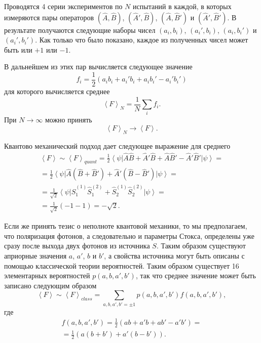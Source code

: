 Проводятся 4 серии экспериментов по $N$ испытаний в каждой, в которых
измеряются пары операторов $\left(\hat{A},\hat{B}\right)$,
$\left(\hat{A}',\hat{B}\right)$, $\left(\hat{A},\hat{B}'\right)$ и
$\left(\hat{A}',\hat{B}'\right)$. В результате получаются следующие
наборы чисел $\left(a_i, b_i\right)$, $\left(a_i', b_i\right)$, $\left(a_i, b_i'\right)$ и
$\left(a_i', b_i'\right)$. Как только что было показано, каждое
из полученных чисел может быть или $+1$ или $-1$.

В дальнейшем из этих пар вычисляется следующее значение
\begin{equation}
f_i = \frac{1}{2}\left(
a_i b_i + a_i' b_i + a_i b_i' - a_i' b_i'
\right)
\nonumber
\end{equation}
для которого вычисляется среднее
\begin{equation}
\left<F\right>_N = \frac{1}{N}\sum_i f_i.
\label{eqEntangFmain}
\end{equation}
При $N \rightarrow \infty$ можно принять
\begin{equation}
\left<F\right>_N \rightarrow \left<F\right>.
\nonumber
\end{equation}

Квантово механический подход дает следующее выражение для среднего 
\begin{eqnarray}
 \left<F\right> \sim \left<F\right>_{quant} 
=\frac{1}{2}
\left<\psi\right|
\hat{A}\hat{B} + \hat{A}'\hat{B} + \hat{A}\hat{B}' - \hat{A}'\hat{B}'
\left|\psi\right> = 
\nonumber \\
=\frac{1}{2}
\left<\psi\right|
\hat{A}\left(\hat{B} + \hat{B}'\right) + \hat{A}' \left(\hat{B}  -
\hat{B}' \right)
\left|\psi\right> = 
\nonumber \\
= \frac{1}{\sqrt{2}}
\left<\psi\right|
\hat{S}_1^{(1)}\hat{S}_1^{(2)} + \hat{S}_2^{(1)}\hat{S}_2^{(2)}
\left|\psi\right> =
\nonumber \\
= \frac{1}{\sqrt{2}}
\left(-1 - 1\right) = - \sqrt{2}.
\label{eqEntangQuant}
\end{eqnarray}

Если же принять тезис о неполноте квантовой механики, то мы
предполагаем, что поляризация фотонов, а следовательно и параметры
Стокса, определены уже сразу после выхода двух фотонов из источника
$S$.  
Таким образом существуют априорные значения $a$, $a'$, $b$ и $b'$,
а свойства источника могут быть описаны с помощью
классической теории вероятностей.
Таким образом существует 16 элементарных
вероятностей $p\left(a,b,a',b'\right)$, так что среднее значение может
быть записано следующим образом
\begin{equation}
 \left<F\right> \sim \left<F\right>_{class} 
=\sum_{a,b,a',b'=\pm 1} 
p\left(a,b,a',b'\right) f\left(a,b,a',b'\right),
\label{eqEntangClassFuncPre}
\end{equation}
где 
\begin{eqnarray}
 f\left(a,b,a',b'\right) = \frac{1}{2} 
\left(
ab + a'b + ab' - a'b'
\right) = 
\nonumber \\
=
\frac{1}{2} 
\left(
a \left(b + b'\right) + a' \left(b - b'\right)
\right).
\label{eqEntangClassFunc}
\end{eqnarray}

